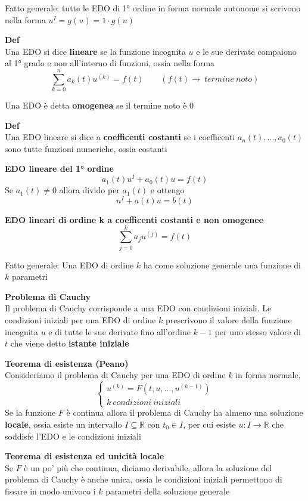\documentclass[12pt, a4paper]{article}
\begin{document}
Fatto generale: tutte le EDO di 1° ordine in forma normale autonome si scrivono nella forma
$u^{I}=g(u)=1\cdot g(u)$

\textbf{Def}\\Una EDO si dice \textbf{lineare} se la funzione incognita $u$ e le sue derivate compaiono al 1° grado
e non all'interno di funzioni, ossia nella forma \[\sum^{n}_{k=0}a_{k}(t)u^{(k)}=f(t)\qquad(f(t)\to\ termine\ noto)\]

Una EDO è detta \textbf{omogenea} se il termine noto è 0

\textbf{Def}\\Una EDO lineare si dice a \textbf{coefficenti costanti} se i coefficenti $a_{n}(t),...,a_{0}(t)$
sono tutte funzioni numeriche, ossia costanti

\textbf{EDO lineare del 1° ordine}\[a_{1}(t)u^{I}+a_{0}(t)u=f(t)\] Se $a_{1}(t)\neq 0$ allora divido per $a_{1}(t)$
e ottengo \[n^{I}+a(t)u=b(t)\]

\textbf{EDO lineari di ordine k a coefficenti costanti e non omogenee}\[\sum^{k}_{j=0}a_{j}u^{(j)}=f(t)\]

Fatto generale: Una EDO di ordine $k$ ha come soluzione generale una funzione di $k$ parametri

\textbf{Problema di Cauchy}\\Il problema di Cauchy corrisponde a una EDO con condizioni iniziali. Le condizioni
iniziali per una EDO di ordine $k$ prescrivono il valore della funzione incognita $u$ e di tutte le sue
derivate fino all'ordine $k-1$ per uno stesso valore di $t$ che viene detto \textbf{istante iniziale}

\textbf{Teorema di esistenza (Peano)}\\Consideriamo il problema di Cauchy per una EDO di ordine $k$ in forma
normale.\[\begin{cases}
        u^{(k)}=F(t,u,...,u^{(k-1)}) \\
        k\ condizioni\ iniziali
    \end{cases}\] Se la funzione $F$ è continua allora il problema di Cauchy ha almeno una soluzione \textbf{locale},
ossia esiste un intervallo $I\subseteq\mathbb{R}$ con $t_{0}\in I$, per cui esiste $u:I\to\mathbb{R}$ che
soddisfe l'EDO e le condizioni iniziali

\textbf{Teorema di esistenza ed unicità locale}\\Se $F$ è un po' più che continua, diciamo derivabile, allora la
soluzione del problema di Cauchy è anche unica, ossia le condizioni iniziali permettono di fissare in modo univoco
i $k$ parametri della soluzione generale
\end{document}
